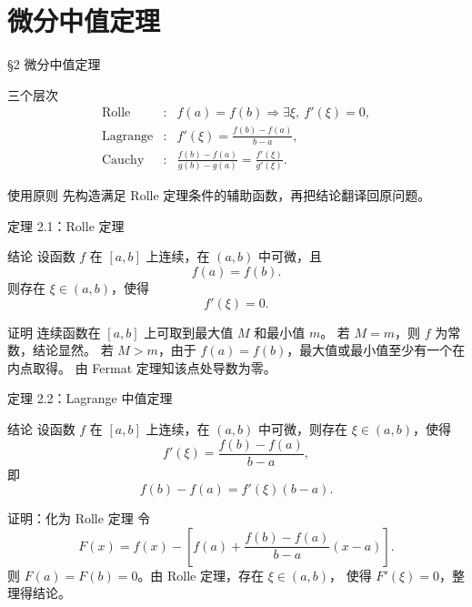 \documentclass[aspectratio=169,10pt]{ctexbeamer}
\begin{document}
\section{微分中值定理}

\begin{frame}{§2 微分中值定理}
\small
\begin{block}{三个层次}
\[
\begin{array}{ccl}
\text{Rolle} &:& f(a)=f(b)\Rightarrow \exists\xi,\ f'(\xi)=0,\\[0.3em]
\text{Lagrange} &:&
  \displaystyle f'(\xi)=\frac{f(b)-f(a)}{b-a},\\[0.7em]
\text{Cauchy} &:&
  \displaystyle
  \frac{f(b)-f(a)}{g(b)-g(a)}
  =
  \frac{f'(\xi)}{g'(\xi)}.
\end{array}
\]
\end{block}
\begin{alertblock}{使用原则}
先构造满足 Rolle 定理条件的辅助函数，再把结论翻译回原问题。
\end{alertblock}
\end{frame}

\begin{frame}{定理 2.1：Rolle 定理}
\small
\begin{block}{结论}
设函数 $f$ 在 $[a,b]$ 上连续，在 $(a,b)$ 中可微，且
\[
  f(a)=f(b).
\]
则存在 $\xi\in(a,b)$，使得
\[
  f'(\xi)=0.
\]
\end{block}
\begin{block}{证明}
连续函数在 $[a,b]$ 上可取到最大值 $M$ 和最小值 $m$。
若 $M=m$，则 $f$ 为常数，结论显然。
若 $M>m$，由于 $f(a)=f(b)$，最大值或最小值至少有一个在内点取得。
由 Fermat 定理知该点处导数为零。
\end{block}
\end{frame}

\begin{frame}{定理 2.2：Lagrange 中值定理}
\small
\begin{block}{结论}
设函数 $f$ 在 $[a,b]$ 上连续，在 $(a,b)$ 中可微，则存在
$\xi\in(a,b)$，使得
\[
  f'(\xi)=\frac{f(b)-f(a)}{b-a},
\]
即
\[
  f(b)-f(a)=f'(\xi)(b-a).
\]
\end{block}
\begin{block}{证明：化为 Rolle 定理}
令
\[
  F(x)=f(x)-\left[f(a)+\frac{f(b)-f(a)}{b-a}(x-a)\right].
\]
则 $F(a)=F(b)=0$。由 Rolle 定理，存在 $\xi\in(a,b)$，
使得 $F'(\xi)=0$，整理得结论。
\end{block}
\end{frame}
\end{document}
